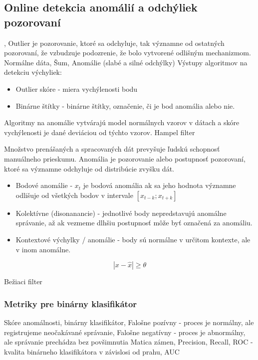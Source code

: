 \newpage
\subsection{Online detekcia anomálií a odchýliek pozorovaní}
\cite{generalized-esd}
\cite{twitter-esd},
Outlier je pozorovanie, ktoré sa odchyluje, tak významne od ostatných pozorovaní, že vzbudzuje
podozrenie, že bolo vytvorené odlišným mechanizmom. Normálne dáta, Šum, Anomálie (slabé a silné odchýlky)
Výstupy algoritmov na detekciu výchyliek:
\begin{itemize}
\itemsep0pt
\item Outlier skóre - miera vychýlenosti bodu
\item Binárne štítky - binárne štítky, označenie, či je bod anomália alebo nie.
\end{itemize}
Algoritmy na anomálie vytvárajú model normálnych vzorov v dátach a skóre vychýlenosti je dané deviáciou od týchto vzorov.
\cite{outlier-analysis}
Hampel filter

\cite{survey-univariate-time-series}
Množstvo prenášaných a spracovaných dát prevyšuje ľudskú schopnosť manuálneho prieskumu. Anomália je pozorovanie alebo postupnosť pozorovaní, ktoré sa významne odchyluje od distribúcie zvyšku dát.
\begin{itemize}
	\item Bodové anomálie - $x_t$ je bodová anomália ak sa jeho hodnota významne odlišuje od všetkých
		bodov v intervale $ [x_{t-k}; x_{t+k}] $
	\item Kolektívne (disonanancie) - jednotlivé body nepredstavujú anomálne správanie, až ak vezmeme dlhšiu postupnosť môže byť označená za anomáliu.
	\item Kontextové výchylky / anomálie - body sú normálne v určitom kontexte, ale v inom anomálne.
\end{itemize}

\cite{review-outlier-datection} \cite{anomaly-detection-algorithms}
\begin{equation}
|x - \hat{x}| \geq \theta
\end{equation}

Bežiaci filter
\cite{anomaly-detection-models}

\subsubsection{Metriky pre binárny klasifikátor}
Skóre anomálnosti, 	binárny klasifikátor,
Falošne pozívny - proces je normálny, ale registrujeme neočakávané správanie,
Falošne negatívny - proces je abnormálny, ale správanie prechádza bez povšimnutia
Matica zámen, Precision, Recall,
ROC - kvalita binárneho klasifikátora v závislosi od prahu, AUC
\cite{wsn-outlier-detection-survey}


